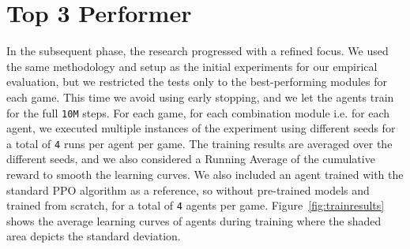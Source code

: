 \section{Top 3 Performer}\label{sec:top-3-performer}
In the subsequent phase, the research progressed with a refined focus.
We used the same methodology and setup as the initial experiments for our empirical evaluation, but we restricted the tests only to the best-performing modules for each game.
This time we avoid using early stopping, and we let the agents train for the full \texttt{10M} steps.
For each game, for each combination module i.e. for each agent, we executed multiple instances of the experiment using different seeds for a total of \texttt{4} runs per agent per game.
The training results are averaged over the different seeds, and we also considered a Running Average of the cumulative reward to smooth the learning curves.
We also included an agent trained with the standard PPO algorithm as a reference, so without pre-trained models and trained from scratch, for a total of \texttt{4} agents per game.
Figure~\ref{fig:trainresults} shows the average learning curves of agents during training where the shaded area depicts the standard deviation.


